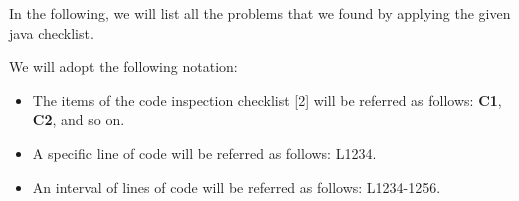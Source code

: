 
In the following, we will list all the problems that we found by applying the given java checklist.

We will adopt the following notation:
\begin{itemize}
	\item The items of the code inspection checklist [2] will be referred as follows:
\textbf{C1}, \textbf{C2}, and so on.
	\item A specific line of code will be referred as follows: L1234.
	\item An interval of lines of code will be referred as follows: L1234-1256.
\end{itemize}
